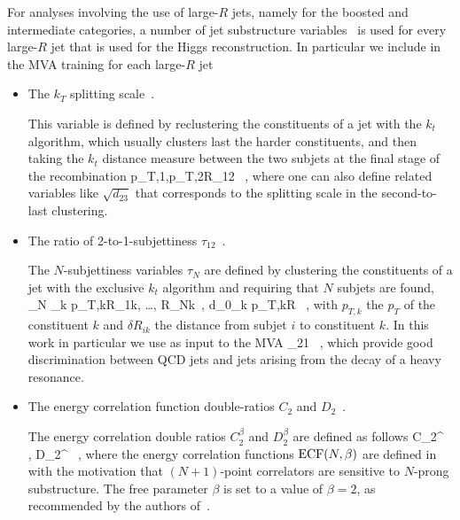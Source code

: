 For analyses involving the use of large-$R$ jets,
namely for the boosted and intermediate categories,
a number of jet substructure variables~\cite{Aad:2013gja} is used
for every large-$R$ jet that is used for the Higgs reconstruction.
%
In particular we include in the MVA training for each large-$R$ jet
\begin{itemize}
\item The $k_T$ splitting scale~\cite{Butterworth:2002tt,Butterworth:2008iy}.

  This variable is defined by reclustering the constituents of a jet with the
  $k_t$ algorithm, which usually clusters last the harder constituents, and then
  taking the $k_t$ distance measure between the two subjets at the final stage of the recombination
  \be
  \label{eq:ktsplitting}
 \lp p_{T,1},p_{T,2}\rp \cdot \Delta R_{12} \, ,
\ee
where one can also define related variables like $\sqrt{d_{23}}$ that corresponds to the
splitting scale in the second-to-last clustering.
  
\item The ratio of 2-to-1-subjettiness $\tau_{12}$~\cite{Thaler:2010tr,Thaler:2011gf}.

  The $N$-subjettiness variables $\tau_N$ are defined by clustering the constituents
  of a jet with the exclusive $k_t$ algorithm and requiring that $N$ subjets are found,
  \be
  \tau_N \equiv {} \sum_k p_{T,k}\lp \delta R_{1k}, \ldots,
  \delta R_{Nk}\rp \, , \qquad d_0\equiv \sum_k p_{T,k}\cdot R \, ,
  \ee
  with $ p_{T,k}$ the $p_T$ of the constituent $k$ and $\delta R_{ik}$ the distance from
  subjet $i$ to constituent $k$.
  In this work in particular we use as input to the MVA
  \be
  \label{eq:tau21}
\tau_{21} \equiv {} \, ,
  \ee
  which provide good discrimination between QCD jets and jets arising from the decay of
  a heavy resonance.
  
\item The energy correlation function double-ratios $C_2$ and $D_2$~\cite{Larkoski:2013eya,Larkoski:2014gra}.

  The energy correlation double ratios  $C_2^{\beta}$
  and $D_2^{\beta}$ are defined
  as follows
  \be
  \label{eq:c2}
C_2^{\beta} \equiv {} \, ,
\ee
 \be
  \label{eq:d2}
D_2^{\beta} \equiv {} \, ,
  \ee
  where the energy correlation functions ${\rm ECF}(N,\beta)$ are defined
  in~\cite{Larkoski:2013eya} with the motivation that $(N+1)$-point correlators
  are sensitive to $N$-prong substructure.
  The free parameter $\beta$ is set to a value of $\beta=2$,
  as recommended by the authors of~\cite{Larkoski:2013eya,Larkoski:2014gra}.
  
\end{itemize}
